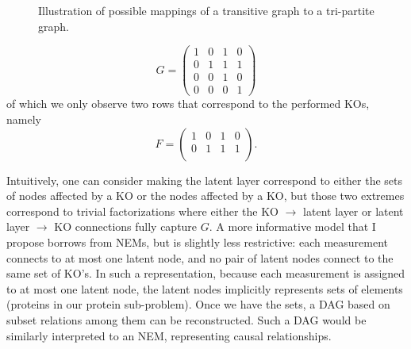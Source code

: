 \documentclass{article}
\begin{document}
\begin{figure}
\begin{tikzpicture}
\end{tikzpicture}
%
\caption{Illustration of possible mappings of a transitive graph to a tri-partite graph.}
\label{fig:general-tri}
\end{figure}

\begin{equation}
  G =
  \begin{pmatrix}
   1 & 0 & 1 & 0 \\
   0 & 1 & 1 & 1 \\
   0 & 0 & 1 & 0 \\
   0 & 0 & 0 & 1
  \end{pmatrix}
\end{equation}
of which we only observe two rows that correspond to the performed KOs, namely
\begin{equation}
  F =
  \begin{pmatrix}
   1 & 0 & 1 & 0 \\
   0 & 1 & 1 & 1 \\
  \end{pmatrix}
  \text{.}
\end{equation}

Intuitively, one can consider making the latent layer correspond to either the sets of nodes affected by a KO or the nodes affected by a KO, but those two extremes correspond to trivial factorizations where either the KO $\rightarrow$ latent layer or latent layer $\rightarrow$ KO connections fully capture $G$.
A more informative model that I propose borrows from NEMs, but is slightly less restrictive: each measurement connects to at most one latent node, and no pair of latent nodes connect to the same set of KO's.
In such a representation, because each measurement is assigned to at most one latent node, the latent nodes implicitly represents sets of elements (proteins in our protein sub-problem).
Once we have the sets, a DAG based on subset relations among them can be reconstructed.
Such a DAG would be similarly interpreted to an NEM, representing causal relationships.
\end{document}
